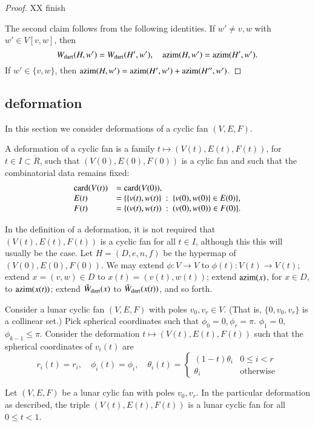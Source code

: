 \begin{proof}
XX finish

The second claim follows from the following identities.
If $w'\ne v,w$ with $w'\in V[v,w]$, then
$$
W_{\text{dart}}(H,w')=W_{\text{dart}}(H',w'),\quad {\operatorname{azim}}(H,w') = {\operatorname{azim}}(H',w').
$$
If $w'\in\{v,w\}$, then
${\operatorname{azim}}(H,w')={\operatorname{azim}}(H',w') +{\operatorname{azim}}(H'',w')$.
\end{proof}

\subsection{deformation}

In this section we consider deformations of a cyclic fan $(V,E,F)$.

\begin{definition}
A deformation of a cyclic fan is a family $t\mapsto (V(t),E(t),F(t))$, for $t\in I\subset\ring{R}$, such that $(V(0),E(0),F(0))$ is a cylic fan and such that the combinatorial data remains fixed:
$$
\begin{array}{lll}
{\operatorname{card}}(V(t)) &= {\operatorname{card}}(V(0)),\\
E(t)&=\{\{v(t),w(t)\}\ :\  \{v(0),w(0)\}\in E(0)\},\\
F(t)&= \{(v(t),w(t)) \ :\   (v(0),w(0))\in F(0)\}.
\end{array}
$$
\end{definition}

In the definition of a deformation, it is not required that $(V(t),E(t),F(t))$ is a cyclic fan for all $t\in I$, although this this will usually be the case.  Let $H=(D,e,n,f)$ be the hypermap of $(V(0),E(0),F(0))$.  We may extend $\phi:V\to V$ to $\phi(t):V(t)\to V(t)$; extend $x=(v,w)\in D$ to $x(t)=(v(t),w(t))$; extend ${\operatorname{azim}}(x)$, for $x\in D$,  to ${\operatorname{azim}}(x(t))$; extend $\bar W_{\text{dart}}(x)$ to $\bar W_{\text{dart}}(x(t))$, and so forth. 


Consider a lunar cyclic fan $(V,E,F)$ with poles $v_0,v_r\in V$.  (That is, $\{0,v_0,v_r\}$ is a collinear set.)   Pick spherical coordinates such that $\phi_0=0,\phi_r=\pi$.  $\phi_1=0$, $\phi_{k-1}\le\pi$.  Consider the deformation $t\mapsto (V(t),E(t),F(t))$ such that the spherical coordinates of $v_i(t)$ are
$$
r_i(t)=r_i,\quad \phi_i(t)=\phi_i,\quad \theta_i(t) =
\begin{cases} 
   (1-t) \theta_i & 0\le i< r\\ 
   \theta_i & \text{otherwise}
\end{cases}
$$

\begin{lemma} Let $(V,E,F)$ be a lunar cylic fan with poles $v_0,v_r$.  In the particular deformation as described, the triple $(V(t),E(t),F(t))$ is a lunar cyclic fan for all $0\le t< 1$.
\end{lemma}

